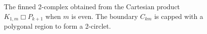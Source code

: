 \documentclass{amsart}
\begin{document}
\begin{figure}[htb]
\caption{The finned 2-complex obtained from the Cartesian product $K_{1,m}\Box P_{k+1}$ when $m$ is even. The boundary $C_{km}$ is capped with a polygonal region to form a 2-circlet.}
\label{fig:circlet}
\end{figure}
\end{document}
